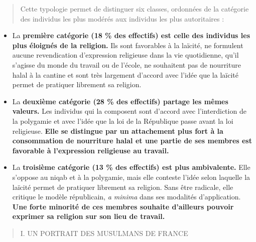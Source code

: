 \begin{quote}
Cette typologie permet de distinguer six classes, ordonnées de la
catégorie des individus les plus modérés aux individus les plus
autoritaires :
\end{quote}

\begin{itemize}
\item
  La \textbf{première catégorie (18 \% des effectifs) est celle des
  individus les plus éloignés de la religion.} Ils sont favorables à la
  laïcité, ne formulent aucune revendication d'expression religieuse
  dans la vie quotidienne, qu'il s'agisse du monde du travail ou de
  l'école, ne souhaitent pas de nourriture halal à la cantine et sont
  très largement d'accord avec l'idée que la laïcité permet de pratiquer
  librement sa religion.
\item
  La \textbf{deuxième catégorie (28 \% des effectifs) partage les mêmes
  valeurs.} Les individus qui la composent sont d'accord avec
  l'interdiction de la polygamie et avec l'idée que la loi de la
  République passe avant la loi religieuse. \textbf{Elle se distingue
  par un attachement plus fort à la consommation de nourriture halal et
  une partie de ses membres est favorable à l'expression religieuse au
  travail.}
\item
  La \textbf{troisième catégorie (13 \% des effectifs) est plus
  ambivalente.} Elle s'oppose au niqab et à la polygamie, mais elle
  conteste l'idée selon laquelle la laïcité permet de pratiquer
  librement sa religion. Sans être radicale, elle critique le modèle
  républicain, \emph{a minima} dans ses modalités d'application.
  \textbf{Une forte minorité de ces membres souhaite d'ailleurs pouvoir
  exprimer sa religion sur son lieu de travail.}
\end{itemize}

\begin{quote}
I. UN PORTRAIT DES MUSULMANS DE FRANCE
\end{quote}

